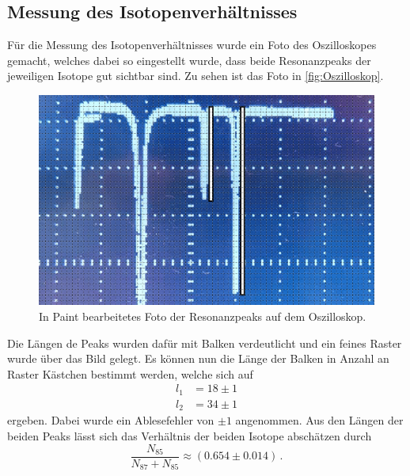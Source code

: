 \subsection{Messung des Isotopenverhältnisses}
Für die Messung des Isotopenverhältnisses wurde ein Foto des Oszilloskopes gemacht, welches dabei so eingestellt wurde, dass beide Resonanzpeaks der jeweiligen Isotope gut sichtbar sind.
Zu sehen ist das Foto in \autoref{fig:Oszilloskop}.
\begin{figure}[H]
  \centering
  \includegraphics[width=0.6\linewidth]{build/peaks_len.pdf}
  \caption{In Paint bearbeitetes Foto der Resonanzpeaks auf dem Oszilloskop. \cite{ms_paint}}
  \label{fig:Oszilloskop}
\end{figure}
\noindent
Die Längen de Peaks wurden dafür mit Balken verdeutlicht und ein feines Raster wurde über das Bild gelegt. Es können nun die Länge der Balken in Anzahl an Raster Kästchen bestimmt werden, welche sich auf
\begin{align*}
  l_{1} &=  18 \pm 1 \\
  l_{2} &=  34 \pm 1
\end{align*}
ergeben. Dabei wurde ein Ablesefehler von $\pm 1$ angenommen. Aus den Längen der beiden Peaks lässt sich das Verhältnis der beiden Isotope abschätzen durch
\begin{equation}
  \frac{N_{85}}{N_{87} + N_{85}} \approx \left( 0.654 \pm 0.014 \right) \, .
\end{equation}

